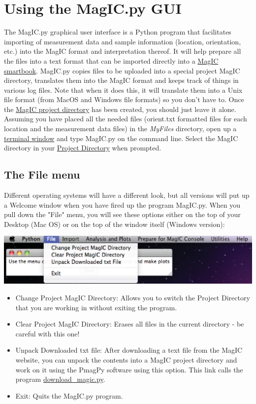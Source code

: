 \documentclass[11pt]{book}
\begin{document}
{\section{Using the MagIC.py GUI}
The MagIC.py graphical user interface is a Python program that facilitates importing of measurement data and sample information (location, orientation, etc.) into the MagIC format and interpretation thereof. It will help prepare all the files into a text format that can be imported directly into a \href{http://earthref.org/cgi-bin/help.cgi?lib=magic\qquad &id=140}{MagIC smartbook}. MagIC.py copies files to be uploaded into a special project MagIC directory, translates them into the MagIC format and keeps track of things in various log files.  Note that when it does this, it  will translate them into a Unix file format (from MacOS and Windows file formats) so you don't have to.  Once the \href{#Project_Directory} {MagIC project directory} has been created, you should just leave it alone.  Assuming you have placed all the needed files (orient.txt formatted files for each location and the measurement data files) in the {\it MyFiles} directory, open up a \href{#command_line }{terminal window} and type MagIC.py on the command line. Select the MagIC directory in your \href{#Project_Directory}{Project Directory} when prompted.

\subsection{The File menu}
Different operating systems will have a different look, but all versions will put up a Welcome window when you have fired up the program MagIC.py. When you pull down the "File" menu, you will see these options either on the top of your Desktop (Mac OS) or on the top of the window itself (Windows version):

\includegraphics[width=15cm]{EPSfiles/FileMenu.eps}

\begin{itemize}
\item  Change Project MagIC Directory: Allows you to switch the Project Directory that you are working in without exiting the program.
\item Clear Project MagIC Directory: Erases all files in the current directory - be careful with this one!
\item Unpack Downloaded txt file: After downloading a text file from the MagIC website, you can unpack the contents into a MagIC project directory and work on it using the PmagPy software using this option. This link calls the program \href{#download\_magic.py}{download\_magic.py}.  
 \item    Exit: Quits the MagIC.py program.
 \end{itemize}
 
}
\end{document}
